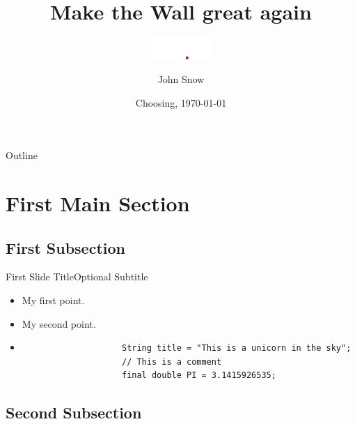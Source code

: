 \documentclass{beamer}
\title{Make the Wall great again}
\subtitle{\includegraphics[height=8mm]{../img/studip-logo@2x}}
\author{John Snow}
\institute[Night's Watch]{\inst{} Castle Black\\ The Wall}
\date{Choosing, \today}
\begin{document}
\begin{frame}
    \titlepage
\end{frame}


\begin{frame}{Outline}
    \tableofcontents
\end{frame}

\section{First Main Section}

\subsection{First Subsection}

\begin{frame}[fragile]{First Slide Title}{Optional Subtitle}
    \begin{itemize}
        \item {My first point.}
        \item {My second point.}

        \item[]{\begin{verbatim}
                    String title = "This is a unicorn in the sky";
                    // This is a comment
                    final double PI = 3.1415926535;
                \end{verbatim}
        }
    \end{itemize}
\end{frame}

\subsection{Second Subsection}
\end{document}
